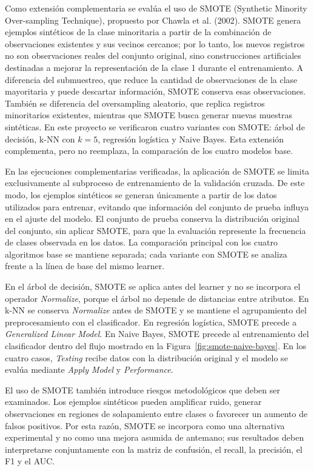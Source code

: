 \documentclass[12pt,a4paper]{article}
\begin{document}
Como extensión complementaria se evalúa el uso de SMOTE (Synthetic Minority Over-sampling Technique), propuesto por Chawla et al. (2002). SMOTE genera ejemplos sintéticos de la clase minoritaria a partir de la combinación de observaciones existentes y sus vecinos cercanos; por lo tanto, los nuevos registros no son observaciones reales del conjunto original, sino construcciones artificiales destinadas a mejorar la representación de la clase 1 durante el entrenamiento. A diferencia del submuestreo, que reduce la cantidad de observaciones de la clase mayoritaria y puede descartar información, SMOTE conserva esas observaciones. También se diferencia del oversampling aleatorio, que replica registros minoritarios existentes, mientras que SMOTE busca generar nuevas muestras sintéticas. En este proyecto se verificaron cuatro variantes con SMOTE: árbol de decisión, k-NN con $k=5$, regresión logística y Naive Bayes. Esta extensión complementa, pero no reemplaza, la comparación de los cuatro modelos base.

En las ejecuciones complementarias verificadas, la aplicación de SMOTE se limita exclusivamente al subproceso de entrenamiento de la validación cruzada. De este modo, los ejemplos sintéticos se generan únicamente a partir de los datos utilizados para entrenar, evitando que información del conjunto de prueba influya en el ajuste del modelo. El conjunto de prueba conserva la distribución original del conjunto, sin aplicar SMOTE, para que la evaluación represente la frecuencia de clases observada en los datos. La comparación principal con los cuatro algoritmos base se mantiene separada; cada variante con SMOTE se analiza frente a la línea de base del mismo learner.

En el árbol de decisión, SMOTE se aplica antes del learner y no se incorpora el operador \textit{Normalize}, porque el árbol no depende de distancias entre atributos. En k-NN se conserva \textit{Normalize} antes de SMOTE y se mantiene el agrupamiento del preprocesamiento con el clasificador. En regresión logística, SMOTE precede a \textit{Generalized Linear Model}. En Naive Bayes, SMOTE precede al entrenamiento del clasificador dentro del flujo mostrado en la Figura~\ref{fig:smote-naive-bayes}. En los cuatro casos, \textit{Testing} recibe datos con la distribución original y el modelo se evalúa mediante \textit{Apply Model} y \textit{Performance}.

El uso de SMOTE también introduce riesgos metodológicos que deben ser examinados. Los ejemplos sintéticos pueden amplificar ruido, generar observaciones en regiones de solapamiento entre clases o favorecer un aumento de falsos positivos. Por esta razón, SMOTE se incorpora como una alternativa experimental y no como una mejora asumida de antemano; sus resultados deben interpretarse conjuntamente con la matriz de confusión, el recall, la precisión, el F1 y el AUC.
\end{document}
